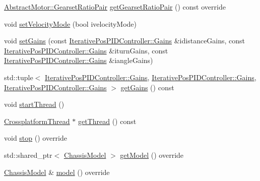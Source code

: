 \begin{DoxyCompactItemize}
\item 
\mbox{\hyperlink{structokapi_1_1AbstractMotor_1_1GearsetRatioPair}{Abstract\+Motor\+::\+Gearset\+Ratio\+Pair}} \mbox{\hyperlink{classokapi_1_1ChassisControllerPID_a50673f2911c969e2f6e89b02a29ce582}{get\+Gearset\+Ratio\+Pair}} () const override
\item 
void \mbox{\hyperlink{classokapi_1_1ChassisControllerPID_a2325280ebca6ddc45fe6bc197b0dcb00}{set\+Velocity\+Mode}} (bool ivelocity\+Mode)
\item 
void \mbox{\hyperlink{classokapi_1_1ChassisControllerPID_a0ca6f7a6fd0da41031681d09614a8837}{set\+Gains}} (const \mbox{\hyperlink{structokapi_1_1IterativePosPIDController_1_1Gains}{Iterative\+Pos\+P\+I\+D\+Controller\+::\+Gains}} \&idistance\+Gains, const \mbox{\hyperlink{structokapi_1_1IterativePosPIDController_1_1Gains}{Iterative\+Pos\+P\+I\+D\+Controller\+::\+Gains}} \&iturn\+Gains, const \mbox{\hyperlink{structokapi_1_1IterativePosPIDController_1_1Gains}{Iterative\+Pos\+P\+I\+D\+Controller\+::\+Gains}} \&iangle\+Gains)
\item 
std\+::tuple$<$ \mbox{\hyperlink{structokapi_1_1IterativePosPIDController_1_1Gains}{Iterative\+Pos\+P\+I\+D\+Controller\+::\+Gains}}, \mbox{\hyperlink{structokapi_1_1IterativePosPIDController_1_1Gains}{Iterative\+Pos\+P\+I\+D\+Controller\+::\+Gains}}, \mbox{\hyperlink{structokapi_1_1IterativePosPIDController_1_1Gains}{Iterative\+Pos\+P\+I\+D\+Controller\+::\+Gains}} $>$ \mbox{\hyperlink{classokapi_1_1ChassisControllerPID_ae158a6b789d5a8ce97391d7251ee936a}{get\+Gains}} () const
\item 
void \mbox{\hyperlink{classokapi_1_1ChassisControllerPID_aaf7664abcf588a985bb8755df62eacd9}{start\+Thread}} ()
\item 
\mbox{\hyperlink{classCrossplatformThread}{Crossplatform\+Thread}} $\ast$ \mbox{\hyperlink{classokapi_1_1ChassisControllerPID_a1f46569d95876a690e99048e0fd9935e}{get\+Thread}} () const
\item 
void \mbox{\hyperlink{classokapi_1_1ChassisControllerPID_a852462fc20fb2322bbb3fd984b01a121}{stop}} () override
\item 
std\+::shared\+\_\+ptr$<$ \mbox{\hyperlink{classokapi_1_1ChassisModel}{Chassis\+Model}} $>$ \mbox{\hyperlink{classokapi_1_1ChassisControllerPID_adffe6c9a65b6bd7664e0a884638d9097}{get\+Model}} () override
\item 
\mbox{\hyperlink{classokapi_1_1ChassisModel}{Chassis\+Model}} \& \mbox{\hyperlink{classokapi_1_1ChassisControllerPID_a225446cae7b569ff104d41d9aa2ae9b8}{model}} () override
\end{DoxyCompactItemize}
